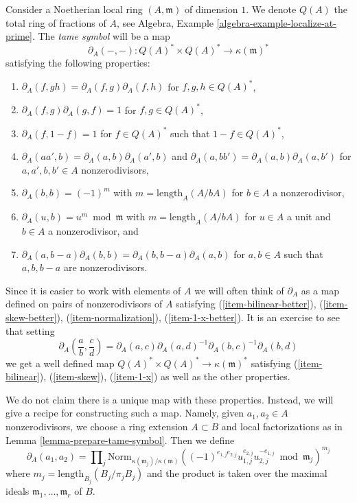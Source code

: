 \noindent
Consider a Noetherian local ring $(A, \mathfrak m)$ of dimension $1$.
We denote $Q(A)$ the total ring of fractions of $A$, see
Algebra, Example \ref{algebra-example-localize-at-prime}.
The {\it tame symbol} will be a map
$$
\partial_A(-, -) : Q(A)^* \times Q(A)^* \longrightarrow \kappa(\mathfrak m)^*
$$
satisfying the following properties:
\begin{enumerate}
\item $\partial_A(f, gh) = \partial_A(f, g) \partial_A(f, h)$
\label{item-bilinear}
for $f, g, h \in Q(A)^*$,
\item $\partial_A(f, g) \partial_A(g, f) = 1$
\label{item-skew}
for $f, g \in Q(A)^*$,
\item $\partial_A(f, 1 - f) = 1$
\label{item-1-x}
for $f \in Q(A)^*$ such that $1 - f \in Q(A)^*$,
\item $\partial_A(aa', b) = \partial_A(a, b)\partial_A(a', b)$
\label{item-bilinear-better}
and $\partial_A(a, bb') = \partial_A(a, b)\partial_A(a, b')$
for $a, a', b, b' \in A$ nonzerodivisors,
\item $\partial_A(b, b) = (-1)^m$
\label{item-skew-better}
with $m = \text{length}_A(A/bA)$
for $b \in A$ a nonzerodivisor,
\item $\partial_A(u, b) = u^m \bmod \mathfrak m$
\label{item-normalization}
with $m = \text{length}_A(A/bA)$ for $u \in A$ a unit and
$b \in A$ a nonzerodivisor, and
\item
\label{item-1-x-better}
$\partial_A(a, b - a)\partial_A(b, b) = \partial_A(b, b - a)\partial_A(a, b)$
for $a, b \in A$ such that $a, b, b - a$ are nonzerodivisors.
\end{enumerate}
Since it is easier to work with elements of $A$ we will
often think of $\partial_A$ as a map defined on pairs of
nonzerodivisors of $A$ satisfying (\ref{item-bilinear-better}),
(\ref{item-skew-better}), (\ref{item-normalization}),
(\ref{item-1-x-better}). It is an exercise to see that
setting
$$
\partial_A(\frac{a}{b}, \frac{c}{d}) =
\partial_A(a, c) \partial_A(a, d)^{-1} \partial_A(b, c)^{-1} \partial_A(b, d)
$$
we get a well defined map $Q(A)^* \times Q(A)^* \to \kappa(\mathfrak m)^*$
satisfying (\ref{item-bilinear}), (\ref{item-skew}), (\ref{item-1-x})
as well as the other properties.

\medskip\noindent
We do not claim there is a unique map with these properties.
Instead, we will give a recipe for constructing such a map.
Namely, given $a_1, a_2 \in A$ nonzerodivisors, we choose
a ring extension $A \subset B$ and local factorizations
as in Lemma \ref{lemma-prepare-tame-symbol}.
Then we define
\begin{equation}
\label{equation-tame-symbol}
\partial_A(a_1, a_2) = \prod\nolimits_j
\text{Norm}_{\kappa(\mathfrak m_j)/\kappa(\mathfrak m)}
((-1)^{e_{1, j}e_{2, j}}u_{1, j}^{e_{2, j}}u_{2, j}^{-e_{1, j}}
\bmod \mathfrak m_j)^{m_j}
\end{equation}
where $m_j = \text{length}_{B_j}(B_j/\pi_j B_j)$ and the product
is taken over the maximal ideals $\mathfrak m_1, \ldots, \mathfrak m_r$ of $B$.

